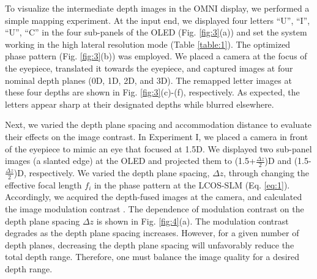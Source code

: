 \documentclass[9pt,twocolumn,twoside]{osajnl}
\begin{document}
To visualize the intermediate depth images in the OMNI display, we performed a simple mapping experiment. At the input end, we displayed four letters “U”, “I”, “U”, “C” in the four sub-panels of the OLED (Fig. \ref{fig:3}(a)) and set the system working in the high lateral resolution mode (Table \ref{table:1}). The optimized phase pattern (Fig. \ref{fig:3}(b)) was employed. We placed a camera at the focus of the eyepiece, translated it towards the eyepiece, and captured images at four nominal depth planes (0D, 1D, 2D, and 3D). The remapped letter images at these four depths are shown in Fig. \ref{fig:3}(c)-(f), respectively. As expected, the letters appear sharp at their designated depths while blurred elsewhere.\par
Next, we varied the depth plane spacing and accommodation distance to evaluate their effects on the image contrast. In Experiment I, we placed a camera in front of the eyepiece to mimic an eye that focused at 1.5D. We displayed two sub-panel images (a slanted edge) at the OLED and projected them to (1.5+$\frac{\Delta z}{2}$)D and (1.5-$\frac{\Delta z}{2}$)D, respectively. We varied the depth plane spacing, $\Delta z$, through changing the effective focal length $f_i$ in the phase pattern at the LCOS-SLM (Eq. \ref{eq:1}). Accordingly, we acquired the depth-fused images at the camera, and calculated the image modulation contrast \cite{hu2014design}. The dependence of modulation contrast on the depth plane spacing $\Delta z$ is shown in Fig. \ref{fig:4}(a). The modulation contrast degrades as the depth plane spacing increases. However, for a given number of depth planes, decreasing the depth plane spacing will unfavorably reduce the total depth range. Therefore, one must balance the image quality for a desired depth range.\par
\end{document}
